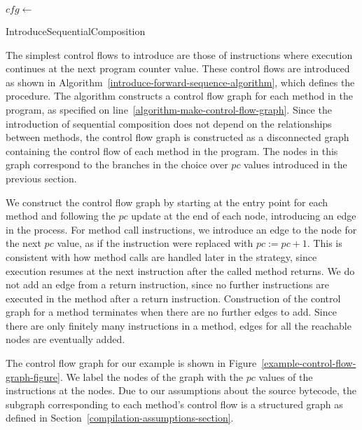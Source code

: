 \begin{algorithm}
  \begin{algorithmic}[1]
    \State $cfg \gets$ 
    \label{algorithm-make-control-flow-graph}
    \label{algorithm-sequence-cfg-loop}
    \label{algorithm-forward-sequence-condition}
    \State {}
    \label{algorithm-forward-sequence-application}
    \EndWhile
    \EndFor
  \end{algorithmic}
  \caption{IntroduceSequentialComposition}
  \label{introduce-forward-sequence-algorithm}
\end{algorithm}
The simplest control flows to introduce are those of instructions
where execution continues at the next program counter value.
These control flows are introduced as shown in
Algorithm~\ref{introduce-forward-sequence-algorithm}, which defines
the  procedure.
The algorithm constructs a control flow graph for each method in the
program, as specified on line~\ref{algorithm-make-control-flow-graph}.
Since the introduction of sequential composition does not depend on
the relationships between methods, the control flow graph is
constructed as a disconnected graph containing the control flow of
each method in the program.
The nodes in this graph correspond to the branches in the choice over
$pc$ values introduced in the previous section.

We construct the control flow graph by starting at the entry point for
each method and following the $pc$ update at the end of each node,
introducing an edge in the process.
For method call instructions, we introduce an edge to the node for the
next $pc$ value, as if the instruction were replaced with
$pc := pc + 1$.
This is consistent with how method calls are handled later in the
strategy, since execution resumes at the next instruction after the
called method returns.
We do not add an edge from a return instruction, since no further
instructions are executed in the method after a return instruction.
Construction of the control graph for a method terminates when there
are no further edges to add.
Since there are only finitely many instructions in a method, edges for
all the reachable nodes are eventually added.

The control flow graph for our example is shown in
Figure~\ref{example-control-flow-graph-figure}.
We label the nodes of the graph with the $pc$ values of the
instructions at the nodes.
Due to our assumptions about the source bytecode, the subgraph
corresponding to each method's control flow is a structured graph as
defined in Section~\ref{compilation-assumptions-section}.

